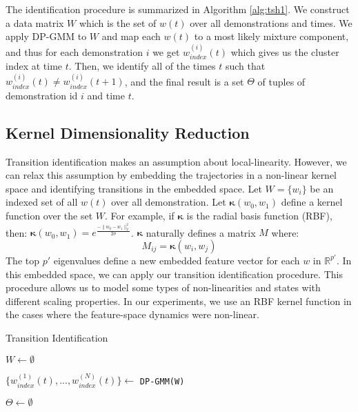 The identification procedure is summarized in Algorithm \ref{alg:tsh1}.
We construct a data matrix $W$ which is the set of $w(t)$ over all demonstrations and times.
We apply DP-GMM to $W$ and map each $w(t)$ to a most likely mixture component, and thus for each demonstration $i$ we get $w_{index}^{(i)}(t)$ which gives us the cluster index at time $t$.
Then, we identify all of the times $t$ such that $w_{index}^{(i)}(t) \ne w_{index}^{(i)}(t+1)$, and the final result is a set $\Theta$ of tuples of demonstration id $i$ and time $t$.

\subsection{Kernel Dimensionality Reduction}\label{sec:kern}
Transition identification makes an assumption about local-linearity.
However, we can relax this assumption by embedding the trajectories in a non-linear kernel space and identifying transitions in the embedded space.
Let $W = \{w_i\}$ be an indexed set of all $w(t)$ over all demonstration.
Let $\mathbf{\kappa}(w_0,w_1)$ define a kernel function over the set $W$.
For example, if $\mathbf{\kappa}$ is the radial basis function (RBF), then:
$ \mathbf{\kappa}(w_0,w_1) = e^{\frac{-\|w_0-w_1\|_2^2}{2\sigma}}$.
$\mathbf{\kappa}$ naturally defines a matrix $M$ where:
\[
M_{ij} = \mathbf{\kappa}(w_i,w_j) 
\]
The top $p'$ eigenvalues define a new embedded feature vector for each $w$ in $\mathbb{R}^{p'}$.
In this embedded space, we can apply our transition identification procedure.
This procedure allows us to model some types of non-linearities and states with different scaling properties.
In our experiments, we use an RBF kernel function in the cases where the feature-space dynamics were non-linear. 

\begin{algorithm}[t]
\small
\DontPrintSemicolon
\caption{Transition Identification \label{alg:tsh1}}

$W \leftarrow \emptyset$

$\{w_{index}^{(1)}(t),...,w_{index}^{(N)}(t)\} \leftarrow$ \texttt{DP-GMM(W)}
\vspace{0.5em}

$\Theta \leftarrow \emptyset$


\end{algorithm}

